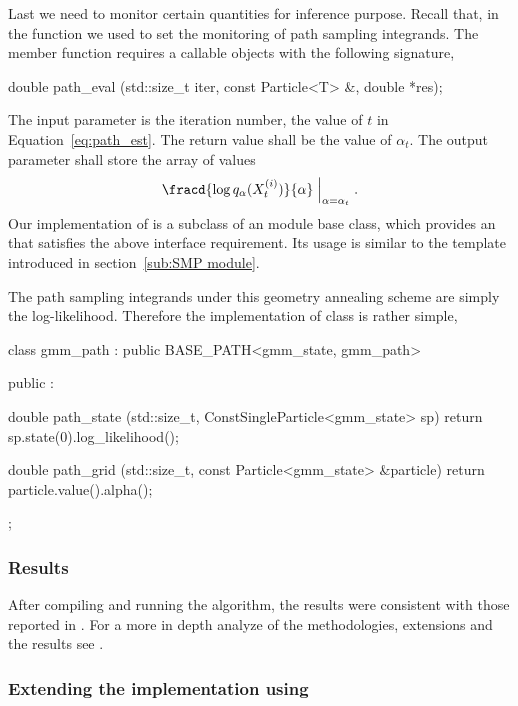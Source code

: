 \documentclass[11pt, fontset=Minion, showoverfull,
bib, mintcode, minted=cache]{marticle}
\begin{document}
Last we need to monitor certain quantities for inference purpose. Recall that,
in the  function we used
 to set the monitoring of path
sampling integrands. The  member function requires a
callable objects with the following signature,
\begin{cppcode}
double path_eval (std::size_t iter, const Particle<T> &, double *res);
\end{cppcode}
The input parameter  is the iteration number, the value of $t$
in Equation~\ref{eq:path_est}. The return value shall be the value of
$\alpha_t$. The output parameter  shall store the array of
values
\begin{equation*}
  \fracd{\log q_{\alpha}(X_t^{(i)})}{\alpha}\Bigm|_{\alpha = \alpha_t}.
\end{equation*}
Our implementation of  is a subclass of an \smp module
base class, which provides an  that satisfies the above
interface requirement. Its usage is similar to the 
template introduced in section~\ref{sub:SMP module}.

The path sampling integrands under this geometry annealing scheme are simply
the log-likelihood. Therefore the implementation of  class
is rather simple,
\begin{cppcode}
class gmm_path : public BASE_PATH<gmm_state, gmm_path>
{
    public :

    double path_state (std::size_t, ConstSingleParticle<gmm_state> sp)
    {return sp.state(0).log_likelihood();}

    double path_grid (std::size_t, const Particle<gmm_state> &particle)
    {return particle.value().alpha();}
};
\end{cppcode}

\subsubsection{Results}

After compiling and running the algorithm, the results were consistent with
those reported in \textcite{DelMoral:2006hc}. For a more in depth analyze of
the methodologies, extensions and the results see \textcite{Zhou2013mc}.

\subsubsection{Extending the implementation using \protect\mpi}
\end{document}

